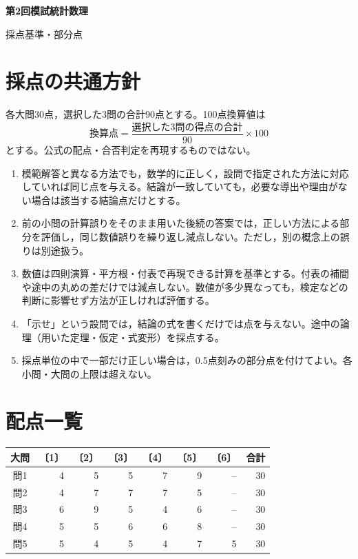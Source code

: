 \documentclass[a4paper,11pt]{ltjsarticle}
\begin{document}
\begin{center}
{\Large\bfseries 第2回模試\quad 統計数理}\par\medskip
{\large 採点基準・部分点}
\end{center}
\section*{採点の共通方針}
各大問30点，選択した3問の合計90点とする。100点換算値は
\[
\text{換算点}=\frac{\text{選択した3問の得点の合計}}{90}\times100
\]
とする。公式の配点・合否判定を再現するものではない。
\begin{enumerate}[label=\arabic*.,leftmargin=2em,itemsep=0.6em]
\item 模範解答と異なる方法でも，数学的に正しく，設問で指定された方法に対応していれば同じ点を与える。結論が一致していても，必要な導出や理由がない場合は該当する結論点だけとする。
\item 前の小問の計算誤りをそのまま用いた後続の答案では，正しい方法による部分を評価し，同じ数値誤りを繰り返し減点しない。ただし，別の概念上の誤りは別途扱う。
\item 数値は四則演算・平方根・付表で再現できる計算を基準とする。付表の補間や途中の丸めの差だけでは減点しない。数値が多少異なっても，検定などの判断に影響せず方法が正しければ評価する。
\item 「示せ」という設問では，結論の式を書くだけでは点を与えない。途中の論理（用いた定理・仮定・式変形）を採点する。
\item 採点単位の中で一部だけ正しい場合は，0.5点刻みの部分点を付けてよい。各小問・大問の上限は超えない。
\end{enumerate}
\section*{配点一覧}
\begin{center}
\begin{tabular}{crrrrrrr}
\toprule
大問 & 〔1〕 & 〔2〕 & 〔3〕 & 〔4〕 & 〔5〕 & 〔6〕 & 合計\\
\midrule
問1 & 4 & 5 & 5 & 7 & 9 & -- & 30\\
問2 & 4 & 7 & 7 & 7 & 5 & -- & 30\\
問3 & 6 & 9 & 5 & 4 & 6 & -- & 30\\
問4 & 5 & 5 & 6 & 6 & 8 & -- & 30\\
問5 & 5 & 4 & 5 & 4 & 7 & 5 & 30\\
\bottomrule
\end{tabular}
\end{center}
\newpage
\end{document}
